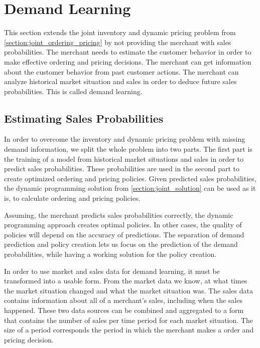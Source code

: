 

\section{Demand Learning}
\label{section:demand_learning}

This section extends the joint inventory and dynamic pricing problem from \cref{section:joint_ordering_pricing} by not providing the merchant with sales probabilities.
The merchant needs to estimate the customer behavior in order to make effective ordering and pricing decisions.
The merchant can get information about the customer behavior from past customer actions.
The merchant can analyze historical market situation and sales in order to deduce future sales probabilities.
This is called demand learning.



\subsection{Estimating Sales Probabilities}
In order to overcome the inventory and dynamic pricing problem with missing demand information, we split the whole problem into two parts.
The first part is the training of a model from historical market situations and sales in order to predict sales probabilities.
These probabilities are used in the second part to create optimized ordering and pricing policies.
Given predicted sales probabilities, the dynamic programming solution from \cref{section:joint_solution} can be used as it is, to calculate ordering and pricing policies.

Assuming, the merchant predicts sales probabilities correctly, the dynamic programming approach creates optimal policies.
In other cases, the quality of policies will depend on the accuracy of predictions. 
The separation of demand prediction and policy creation lets us focus on the prediction of the demand probabilities, while having a working solution for the policy creation.

In order to use market and sales data for demand learning, it must be transformed into a usable form.
From the market data we know, at what times the market situation changed and what the market situation was.
The sales data contains information about all of a merchant's sales, including when the sales happened.
These two data sources can be combined and aggregated to a form that contains the number of sales per time period for each market situation.
The size of a period corresponds the period in which the merchant makes a order and pricing decision.

